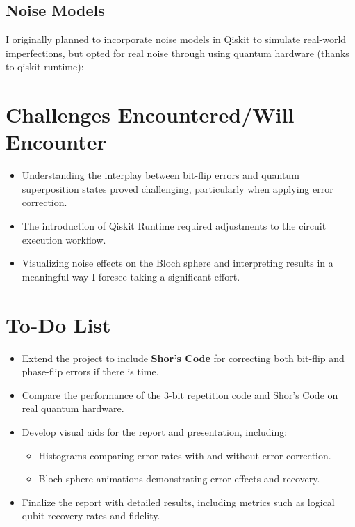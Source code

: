 \documentclass{article}
\begin{document}
\subsection*{Noise Models}
I originally planned to incorporate noise models in Qiskit to simulate real-world imperfections, but opted for real noise through using quantum hardware (thanks to qiskit runtime):

\section*{Challenges Encountered/Will Encounter}

\begin{itemize}
    \item Understanding the interplay between bit-flip errors and quantum superposition states proved challenging, particularly when applying error correction.
    \item The introduction of Qiskit Runtime required adjustments to the circuit execution workflow.
    \item Visualizing noise effects on the Bloch sphere and interpreting results in a meaningful way I foresee taking a significant effort.
\end{itemize}

\section*{To-Do List}

\begin{itemize}
    \item Extend the project to include \textbf{Shor’s Code} for correcting both bit-flip and phase-flip errors if there is time.
    \item Compare the performance of the 3-bit repetition code and Shor’s Code on real quantum hardware.
    \item Develop visual aids for the report and presentation, including:
    \begin{itemize}
        \item Histograms comparing error rates with and without error correction.
        \item Bloch sphere animations demonstrating error effects and recovery.
    \end{itemize}
    \item Finalize the report with detailed results, including metrics such as logical qubit recovery rates and fidelity.
\end{itemize}
\end{document}
